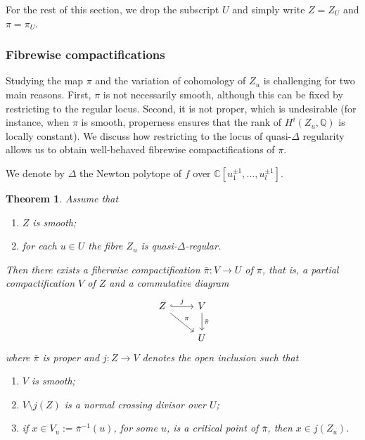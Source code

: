 \documentclass[11pt, reqno]{amsart}
\theoremstyle{plain}
\newtheorem{thm}{Theorem}[section]
\theoremstyle{definition}
\newcommand{\CC}{\mathbb{C}}
\newcommand{\QQ}{\mathbb{Q}}
\newcommand{\bs}{}
\begin{document}
For the rest of this section, we drop the subscript $U$ and simply write  $Z=Z_U$ and $\pi=\pi_U$.

\subsubsection{Fibrewise compactifications} 
\label{sec:fibre-cmpt} 
Studying the map $\pi$ and the variation of cohomology of $Z_u$ is challenging for two main reasons. 
First, $\pi$ is not necessarily smooth, although this can be fixed by restricting to the regular locus. 
Second, it is not proper, which is undesirable (for instance, when $\pi$ is smooth, properness ensures that the rank of $H^i(Z_u, \QQ)$ is locally constant).
We discuss how restricting to the locus of quasi-$\Delta$ regularity allows us to obtain well-behaved fibrewise compactifications of $\pi$.

We denote by $\Delta$ the Newton polytope of $\bs f$ over $\CC[u_1^{\pm1},\dots, u_l^{\pm1}]$.
\begin{thm}\label{thm:compactifying-delta}
    Assume that 
    \begin{enumerate}
        \item $\bs{Z}$ is smooth;
        \item for each $u \in \bs{U}$ the fibre $\bs{Z}_u$ is quasi-$\Delta$-regular.
    \end{enumerate}
    Then there exists a fiberwise compactification $\bar{\bs\pi}: \bs{V} \to \bs{U}$ of $\bs \pi$, that is, a partial compactification $ \bs V$ of $\bs Z$ and  a commutative diagram  
    \[
\begin{tikzcd}
\bs Z  \ar[r,hook, "\bs j" ] \ar[rd, "\bs\pi" ] & \bs V \ar[d, "\bar{\bs \pi}"] \\
 & \bs U 
\end{tikzcd}
\] where $\bar{\bs \pi}$ is proper and $\bs j : \bs Z \to \bs V $ denotes the open inclusion such that
    \begin{enumerate}
    	\item[(i)] $\bs{V}$ is smooth; 
        \item[(ii)] $\bs V \setminus  \bs j(\bs Z)$ is a normal crossing divisor over $\bs{U}$;
        \item[(iii)] if $x\in {\bs V}_u:={\bar{\bs \pi}}^{-1}(u)$, for some $u$, is a critical point of $\bar{\bs \pi}$, then $x \in \bs j(\bs Z_u)$.
    \end{enumerate} 
\end{thm}
\end{document}

